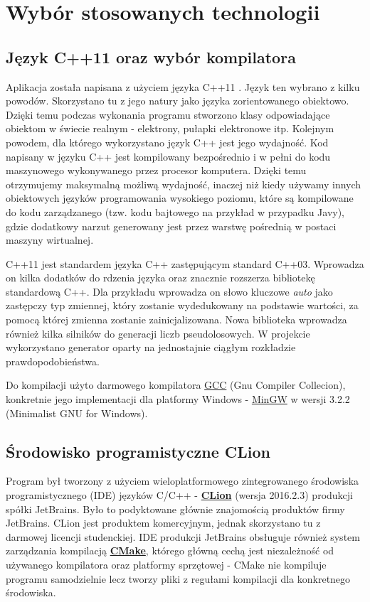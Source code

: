\chapter{Wybór stosowanych technologii}
\label{tech:all}
\section{Język C++11 oraz wybór kompilatora}
Aplikacja została napisana z użyciem języka C++11 \cite{c++}. Język ten
wybrano z kilku powodów. Skorzystano tu z jego natury jako języka zorientowanego obiektowo. Dzięki temu podczas wykonania programu stworzono klasy odpowiadające obiektom w świecie realnym - elektrony, pułapki elektronowe itp.
Kolejnym powodem, dla którego wykorzystano język C++ jest jego wydajność. Kod napisany
w języku C++ jest kompilowany bezpośrednio i w pełni do kodu maszynowego  wykonywanego przez procesor komputera. Dzięki temu
otrzymujemy maksymalną możliwą wydajność, inaczej niż kiedy używamy innych
obiektowych języków programowania wysokiego poziomu, które są kompilowane do kodu
zarządzanego (tzw. kodu bajtowego na przykład w przypadku Javy), gdzie dodatkowy narzut
generowany jest przez warstwę pośrednią w postaci maszyny wirtualnej. 

C++11 jest standardem języka C++ zastępującym standard C++03. Wprowadza on kilka dodatków do rdzenia języka oraz znacznie rozszerza bibliotekę standardową C++. Dla przykładu wprowadza on słowo kluczowe \textit{auto} jako zastępczy typ zmiennej, który zostanie wydedukowany na podstawie wartości, za pomocą której zmienna zostanie zainicjalizowana. Nowa biblioteka wprowadza również kilka silników do generacji liczb pseudolosowych. W projekcie wykorzystano generator oparty na jednostajnie ciągłym rozkładzie prawdopodobieństwa.

Do kompilacji użyto darmowego kompilatora \href{https://gcc.gnu.org/}{GCC} (Gnu Compiler Collecion), konkretnie jego implementacji dla platformy Windows - \href{http://www.mingw.org/}{MinGW} w wersji 3.2.2 (Minimalist GNU for Windows).

\section{Środowisko programistyczne CLion}
\label{tech:clion}
Program był tworzony z użyciem wieloplatformowego zintegrowanego środowiska programistycznego (IDE) języków C/C++ - \href{https://www.jetbrains.com/clion/}{\textbf{CLion}} (wersja 2016.2.3) produkcji spółki JetBrains. Było to podyktowane głównie znajomością produktów firmy JetBrains. CLion jest produktem komercyjnym, jednak skorzystano tu z darmowej licencji studenckiej. IDE produkcji JetBrains obsługuje również 	system zarządzania kompilacją \href{https://cmake.org/}{\textbf{CMake}}, którego główną cechą jest niezależność od używanego kompilatora oraz platformy sprzętowej - CMake nie kompiluje programu samodzielnie lecz tworzy pliki z regułami kompilacji dla konkretnego środowiska.


